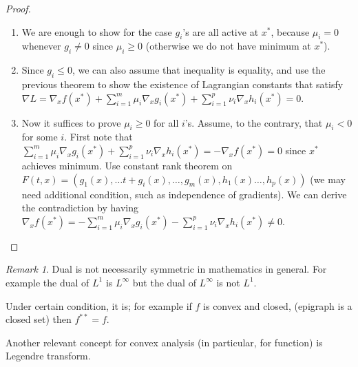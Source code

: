 \documentclass{article}
\theoremstyle{remark}
\newtheorem{remark}[example]{Remark}
\begin{document}
\begin{proof}
\begin{enumerate}
\item We are enough to show for the case $g_i$'s are all active at $x^*$, because
 $\mu_i=0$ whenever $g_i\neq 0$ since $\mu_i\geq 0$ (otherwise we do not have minimum at $x^*$).
\item Since $g_i\leq 0$, we can also assume that inequality is equality, 
and use the previous theorem to show the existence of Lagrangian constants that satisfy $\nabla L=\nabla_x f(x^*)+\sum^m_{i=1}\mu_i\nabla_x g_i(x^*)+\sum^p_{i=1}\nu_i\nabla_x h_i(x^*)=0$.
\item Now it suffices to prove $\mu_i\geq 0$ for all $i$'s. Assume, to the contrary, that $\mu_i<0$ for some $i$.
First note that $\sum^m_{i=1}\mu_i\nabla_x g_i(x^*)+\sum^p_{i=1}\nu_i\nabla_x h_i(x^*)=-\nabla_x f(x^*)=0$ since $x^*$ achieves minimum. 
Use constant rank theorem on $F(t,x)=(g_1(x),\dots t+g_i(x),\dots, g_m(x),h_1(x)\dots,h_p(x))$ (we may need additional condition, such as independence of gradients). 
We can derive the contradiction by having $\nabla_x f(x^*)=-\sum^m_{i=1}\mu_i\nabla_xg_i(x^*)-\sum^p_{i=1}\nu_i\nabla_x h_i(x^*)\neq 0$.
\end{enumerate}
\end{proof}
\begin{remark}
\item Dual is not necessarily symmetric in mathematics in general. For example the dual of $L^1$ is $L^\infty$ but the dual of $L^\infty$ is not $L^1$.
\item Under certain condition, it is; for example if $f$ is convex and closed, (epigraph is a closed set) then $f^{**}=f$.
\item Another relevant concept for convex analysis (in particular, for function) is Legendre transform.
\end{remark}
\end{document}
